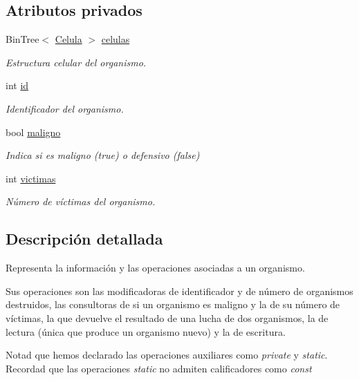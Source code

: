 \subsection*{Atributos privados}
\begin{DoxyCompactItemize}
\item 
Bin\+Tree$<$ \hyperlink{class_celula}{Celula} $>$ \hyperlink{class_organismo_a61023138644fc72610fc99189d3ba2ff}{celulas}
\begin{DoxyCompactList}\small\item\em Estructura celular del organismo. \end{DoxyCompactList}\item 
int \hyperlink{class_organismo_a30be1823d3711fec651a5a4b1dc1cee5}{id}
\begin{DoxyCompactList}\small\item\em Identificador del organismo. \end{DoxyCompactList}\item 
bool \hyperlink{class_organismo_a85a5d1b9d31fa209d1ed0d596dbbed61}{maligno}
\begin{DoxyCompactList}\small\item\em Indica si es maligno (true) o defensivo (false) \end{DoxyCompactList}\item 
int \hyperlink{class_organismo_abb3e56487a080df544a6ff96e5e42520}{victimas}
\begin{DoxyCompactList}\small\item\em Número de víctimas del organismo. \end{DoxyCompactList}\end{DoxyCompactItemize}


\subsection{Descripción detallada}
Representa la información y las operaciones asociadas a un organismo. 

Sus operaciones son las modificadoras de identificador y de número de organismos destruidos, las consultoras de si un organismo es maligno y la de su número de víctimas, la que devuelve el resultado de una lucha de dos organismos, la de lectura (única que produce un organismo nuevo) y la de escritura.

Notad que hemos declarado las operaciones auxiliares como {\itshape private} y {\itshape static}. Recordad que las operaciones {\itshape static} no admiten calificadores como {\itshape const} 

